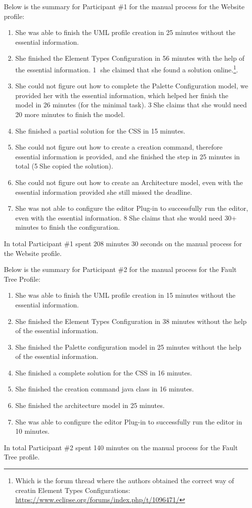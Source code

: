 Below is the summary for Participant \#1 for the manual process for the Website profile:
\begin{enumerate}
	\item She was able to finish the UML profile creation in 25 minutes without the essential information. 
	\item She finished the Element Types Configuration in 56 minutes with the help of the essential information. \textcircled{1} she claimed that she found a solution online.\footnote{Which is the forum thread where the authors obtained the correct way of creatin Element Types Configurations: \url{https://www.eclipse.org/forums/index.php/t/1096471/}}.
	\item She could not figure out how to complete the Palette Configuration model, we provided her with the essential information, which helped her finish the model in 26 minutes (for the minimal task). \textcircled{3}She claims that she would need 20 more minutes to finish the model.
	\item She finished a partial solution for the CSS in 15 minutes.
	\item She could not figure out how to create a creation command, therefore essential information is provided, and she finished the step in 25 minutes in total (\textcircled{5}She copied the solution).
	\item She could not figure out how to create an Architecture model, even with the essential information provided she still missed the deadline.
	\item She was not able to configure the editor Plug-in to successfully run the editor, even with the essential information. \textcircled{8}She claims that she would need 30+ minutes to finish the configuration.
\end{enumerate}
In total Participant \#1 spent 208 minutes 30 seconds on the manual process for the Website profile.

Below is the summary for Participant \#2 for the manual process for the Fault Tree Profile:

\begin{enumerate}
	\item She was able to finish the UML profile creation in 15 minutes without the essential information. 
	\item She finished the Element Types Configuration in 38 minutes without the help of the essential information.
	\item She finished the Palette configuration model in 25 minutes without the help of the essential information.
	\item She finished a complete solution for the CSS in 16 minutes.
	\item She finished the creation command java class in 16 minutes.
	\item She finished the architecture model in 25 minutes.
	\item She was able to configure the editor Plug-in to successfully run the editor in 10 minutes.
\end{enumerate}
In total Participant \#2 spent 140 minutes on the manual process for the Fault Tree profile.

